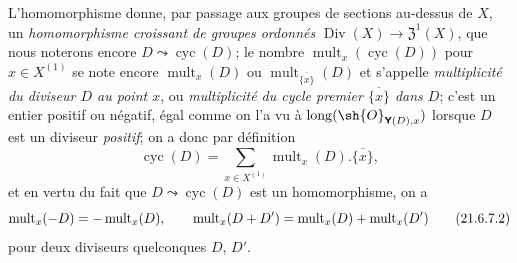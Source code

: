 \begin{env}[21.6.7]
L'homomorphisme  donne, par passage aux groupes de sections au-dessus de $X$, un \emph{homomorphisme croissant de groupes ordonnés} $\operatorname{Div}(X)\to\mathfrak{Z}^1(X)$, que nous noterons encore $D\leadsto\operatorname{cyc}(D)$;
le nombre $\operatorname{mult}_x(\operatorname{cyc}(D))$ pour $x\in X^{(1)}$ se note encore $\operatorname{mult}_x(D)$ ou $\operatorname{mult}_{\overline{\{x\}}}(D)$ et s'appelle \emph{multiplicité du diviseur $D$ au point $x$}, ou \emph{multiplicité du cycle premier $\overline{\{x\}}$ dans $D$};
c'est un entier positif ou négatif, égal comme on l'a vu à $\operatorname{long}(\sh{O}_{\boldsymbol{\mathsf{Y}}(D),x})$ lorsque $D$ est un diviseur \emph{positif};
on a donc par définition
\[
\label{IV.21.6.7.1}
  \operatorname{cyc}(D)=\sum_{x\in X^{(1)}}\operatorname{mult}_x(D).\overline{\{x\}},
  \tag{21.6.7.1}
\]
et en vertu du fait que $D\leadsto\operatorname{cyc}(D)$ est un homomorphisme, on a
\[
\label{IV.21.6.7.2}
  \operatorname{mult}_x(- D)=-\operatorname{mult}_x(D),\qquad
  \operatorname{mult}_x(D+D')=\operatorname{mult}_x(D)+\operatorname{mult}_x(D')
  \tag{21.6.7.2}
\]
pour deux diviseurs quelconques $D$, $D'$.


\end{env}
